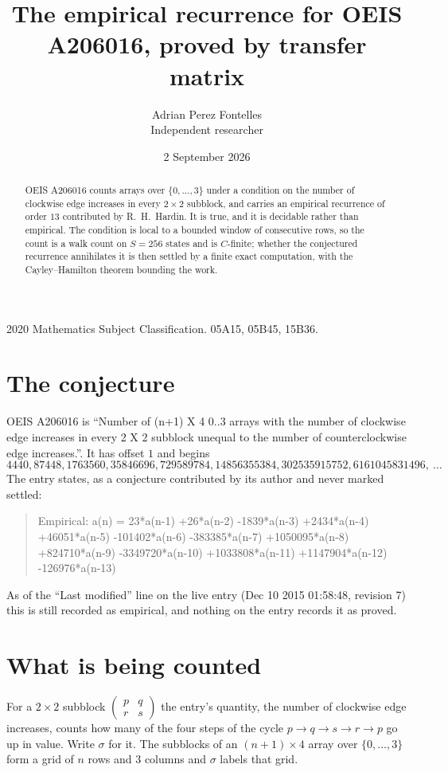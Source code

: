 \documentclass[11pt,a4paper]{article}
\title{The empirical recurrence for OEIS A206016, proved by transfer matrix}
\author{Adrian Perez Fontelles\\ \small Independent researcher}
\date{2 September 2026}
\theoremstyle{plain}
\theoremstyle{definition}
\begin{document}
\maketitle

\begin{abstract}
OEIS A206016 counts arrays over $\{0,\dots,3\}$ under a condition on the number of clockwise edge increases
in every $2\times2$ subblock, and carries an empirical recurrence of order $13$ contributed by
R.~H.~Hardin. It is true, and it is decidable rather than empirical. The condition is local to
a bounded window of consecutive rows, so the count is a walk count on $S=256$ states and is
$C$-finite; whether the conjectured recurrence annihilates it is then settled by a finite exact
computation, with the Cayley--Hamilton theorem bounding the work.
\end{abstract}

\noindent\small 2020 Mathematics Subject Classification. 05A15, 05B45, 15B36.\normalsize

\section{The conjecture}

OEIS A206016 is ``Number of (n+1) X 4 0..3 arrays with the number of clockwise edge increases in every 2 X 2 subblock unequal to the number of counterclockwise edge increases.''. It has offset $1$ and begins
\[
4440, 87448, 1763560, 35846696, 729589784, 14856355384, 302535915752, 6161045831496,\ \dots
\]
The entry states, as a conjecture contributed by its author and never marked settled:
\begin{quote}
Empirical: a(n) = 23*a(n-1) +26*a(n-2) -1839*a(n-3) +2434*a(n-4) +46051*a(n-5) -101402*a(n-6) -383385*a(n-7) +1050095*a(n-8) +824710*a(n-9) -3349720*a(n-10) +1033808*a(n-11) +1147904*a(n-12) -126976*a(n-13)
\end{quote}
As of the ``Last modified'' line on the live entry (Dec 10 2015 01:58:48, revision 7) this is still
recorded as empirical, and nothing on the entry records it as proved.

\section{What is being counted}

For a $2\times2$ subblock $\begin{pmatrix}p&q\\r&s\end{pmatrix}$ the
entry's quantity, the number of clockwise edge increases, counts how many of the four steps of the cycle $p\to q\to s\to r\to p$ go up in value. Write $\sigma$ for it. The subblocks of an
$(n+1)\times4$ array over $\{0,\dots,3\}$ form a grid of $n$ rows and $3$
columns and $\sigma$ labels that grid.
\end{document}
